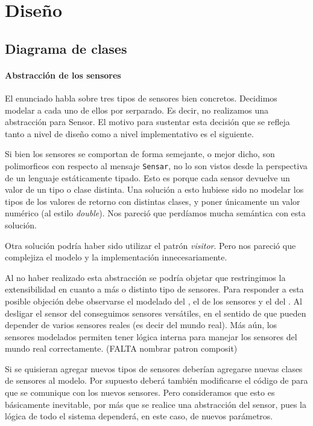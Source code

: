 \section{Dise\~no}

  \subsection{Diagrama de clases}

  \paragraph{Abstracci\'on de los sensores}
  El enunciado habla sobre tres tipos de sensores bien concretos.
  Decidimos modelar a cada uno de ellos por serparado. Es decir, no realizamos
  una abstracci\'on para Sensor. El motivo para sustentar esta decisi\'on
  que se refleja tanto a nivel de dise\~no como a nivel implementativo es
  el siguiente.

  Si bien los sensores se comportan de forma semejante,
  o mejor dicho, son polimorficos con respecto al mensaje \texttt{Sensar},
  no lo son vistos desde la perspectiva de un lenguaje est\'aticamente tipado.
  Esto es porque cada sensor devuelve un valor de un tipo o clase distinta.
  Una soluci\'on a esto hubiese sido no modelar los tipos de los valores de
  retorno con distintas clases, y poner \'unicamente un valor num\'erico
  (al estilo \textit{double}). Nos
  pareci\'o que perd\'iamos mucha sem\'antica con esta soluci\'on.

  Otra soluci\'on podr\'ia haber sido utilizar el patr\'on \textit{visitor}.
  Pero nos pareci\'o que complejiza el modelo y la implementaci\'on innecesariamente.

  Al no haber realizado esta abstracci\'on se podr\'ia objetar que restringimos
  la extensibilidad en cuanto a m\'as o distinto tipo de sensores.
  Para responder a esta posible objeci\'on debe observarse el modelado del
  \condiciones, el de los sensores y el del
  \arduino. Al desligar el sensor del \arduino conseguimos
  sensores vers\'atiles, en el sentido de que pueden depender de varios sensores
  reales (es decir del mundo real). M\'as a\'un, los sensores modelados
  permiten tener l\'ogica interna para manejar los sensores del mundo real
  correctamente.
  (FALTA nombrar patron composit)

  Si se quisieran agregar nuevos tipos de sensores deber\'ian agregarse nuevas
  clases de sensores al modelo. Por supuesto deber\'a tambi\'en modificarse
  el c\'odigo de \condiciones para que se comunique
  con los nuevos sensores. Pero consideramos que esto es b\'asicamente inevitable,
  por m\'as que se realice una abstracci\'on del sensor, pues la l\'ogica
  de todo el sistema depender\'a, en este caso, de nuevos par\'ametros.

